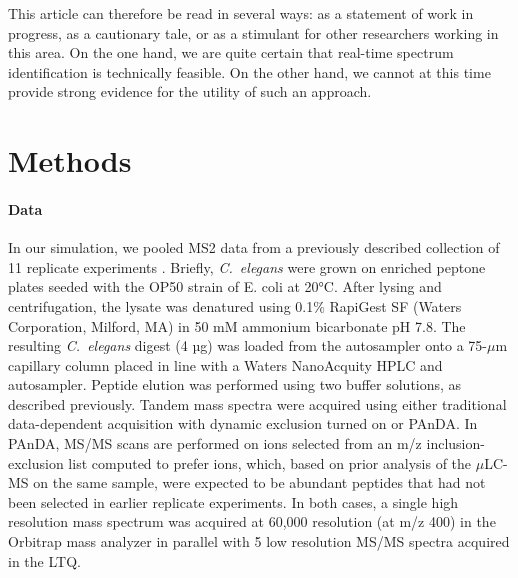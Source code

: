 \documentclass[12pt]{article}
\begin{document}
This article can therefore be read in several ways: as a statement of
work in progress, as a cautionary tale, or as a stimulant for other
researchers working in this area.  On the one hand, we are quite
certain that real-time spectrum identification is technically
feasible.  On the other hand, we cannot at this time provide strong
evidence for the utility of such an approach.

\section*{Methods}

\paragraph{Data}
In our simulation, we pooled MS2 data from a previously described
collection of 11 replicate experiments \cite{hoopmann:post}. Briefly,
{\em C.\ elegans} were grown on enriched peptone plates seeded with
the OP50 strain of E. coli at 20°C. After lysing and centrifugation,
the lysate was denatured using 0.1\% RapiGest SF (Waters Corporation,
Milford, MA) in 50 mM ammonium bicarbonate pH 7.8.  The resulting {\em
  C.\ elegans} digest (4 µg) was loaded from the autosampler onto a
75-$\mu$m capillary column placed in line with a Waters NanoAcquity
HPLC and autosampler.  Peptide elution was performed using two buffer
solutions, as described previously. Tandem mass spectra were acquired
using either traditional data-dependent acquisition with dynamic
exclusion turned on or PAnDA.  In PAnDA, MS/MS scans are performed on
ions selected from an m/z inclusion-exclusion list computed to prefer
ions, which, based on prior analysis of the $\mu$LC-MS on the same
sample, were expected to be abundant peptides that had not been
selected in earlier replicate experiments.  In both cases, a single
high resolution mass spectrum was acquired at 60,000 resolution (at
m/z 400) in the Orbitrap mass analyzer in parallel with 5 low
resolution MS/MS spectra acquired in the LTQ.
\end{document}
